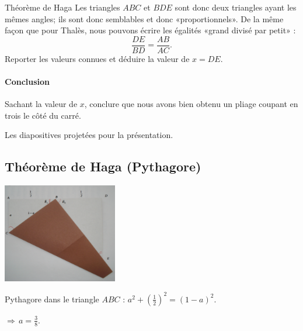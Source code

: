 \begin{feuilleExo}{Théorème de Haga}
Les triangles \( ABC\) et \( BDE\) sont donc deux triangles ayant les mêmes angles; ils sont donc semblables et donc «proportionnels». De la même façon que pour Thalès, nous pouvons écrire les égalités «grand divisé par petit» :
\begin{equation}
    \frac{ DE }{ BD }=\frac{ AB }{ AC }.
\end{equation}
Reporter les valeurs connues et déduire la valeur de \( x=DE\).

\paragraph{Conclusion}

Sachant la valeur de \( x\), conclure que nous avons bien obtenu un pliage coupant en trois le côté du carré.

\end{feuilleExo}


Les diapositives projetées pour la présentation. 

\newpage
\subsection{Théorème de Haga (Pythagore)}

    \begin{multicols}{2}

    \begin{center}        
        \includegraphics[width=5cm]{haga_coupe_anote}
    \end{center}


    Pythagore dans le triangle \( ABC\) : \( a^2+\left( \frac{ 1 }{2} \right)^2=(1-a)^2\).

    \( \Rightarrow \, a=\frac{ 3 }{ 8 }\).
    \end{multicols}

    
\newpage
